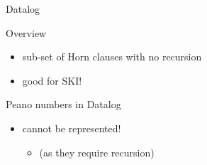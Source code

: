 \documentclass[presentation]{beamer}\mode<presentation>{\usetheme{AMSBolognaFC}}
\begin{document}
\begin{frame}[allowframebreaks]{Datalog}
    \begin{block}{Overview}
        \begin{itemize}
            \item sub-set of Horn clauses with \alert{no recursion}
    
            \bigskip
    
            \item good for SKI!
        \end{itemize}
    \end{block}
    
    \begin{exampleblock}{Peano numbers in Datalog}
        \begin{itemize}
            \item cannot be represented!
            \begin{itemize}
                \item (as they require recursion)
            \end{itemize}
        \end{itemize}
    \end{exampleblock}
\end{frame}
\end{document}
